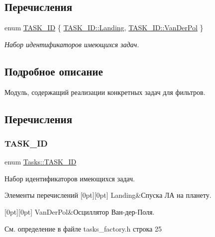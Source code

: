 \subsection*{Перечисления}
\begin{DoxyCompactItemize}
\item 
enum \hyperlink{namespace_tasks_acf6b541f8ce51b63eb9fcb8748317707}{T\+A\+S\+K\+\_\+\+ID} \{ \hyperlink{namespace_tasks_acf6b541f8ce51b63eb9fcb8748317707a41bd61e268fedccfb0d91dd571dd28b2}{T\+A\+S\+K\+\_\+\+I\+D\+::\+Landing}, 
\hyperlink{namespace_tasks_acf6b541f8ce51b63eb9fcb8748317707a7d65b6ff850300fd593c198f76e32d99}{T\+A\+S\+K\+\_\+\+I\+D\+::\+Van\+Der\+Pol}
 \}\begin{DoxyCompactList}\small\item\em Набор идентификаторов имеющихся задач. \end{DoxyCompactList}
\end{DoxyCompactItemize}


\subsection{Подробное описание}
Модуль, содержащий реализации конкретных задач для фильтров. 

\subsection{Перечисления}
\hypertarget{namespace_tasks_acf6b541f8ce51b63eb9fcb8748317707}{}\label{namespace_tasks_acf6b541f8ce51b63eb9fcb8748317707} 
\subsubsection{\texorpdfstring{T\+A\+S\+K\+\_\+\+ID}{TASK\_ID}}
{\footnotesize\ttfamily enum \hyperlink{namespace_tasks_acf6b541f8ce51b63eb9fcb8748317707}{Tasks\+::\+T\+A\+S\+K\+\_\+\+ID}\hspace{0.3cm}{\ttfamily [strong]}}



Набор идентификаторов имеющихся задач. 

\begin{DoxyEnumFields}{Элементы перечислений}
[0pt][0pt]{}\hypertarget{namespace_tasks_acf6b541f8ce51b63eb9fcb8748317707a41bd61e268fedccfb0d91dd571dd28b2}{}\label{namespace_tasks_acf6b541f8ce51b63eb9fcb8748317707a41bd61e268fedccfb0d91dd571dd28b2} 
Landing&Спуска ЛА на планету. \\
\hline

[0pt][0pt]{}\hypertarget{namespace_tasks_acf6b541f8ce51b63eb9fcb8748317707a7d65b6ff850300fd593c198f76e32d99}{}\label{namespace_tasks_acf6b541f8ce51b63eb9fcb8748317707a7d65b6ff850300fd593c198f76e32d99} 
Van\+Der\+Pol&Осциллятор Ван-\/дер-\/Поля. \\
\hline

\end{DoxyEnumFields}


См. определение в файле tasks\+\_\+factory.\+h строка 25

